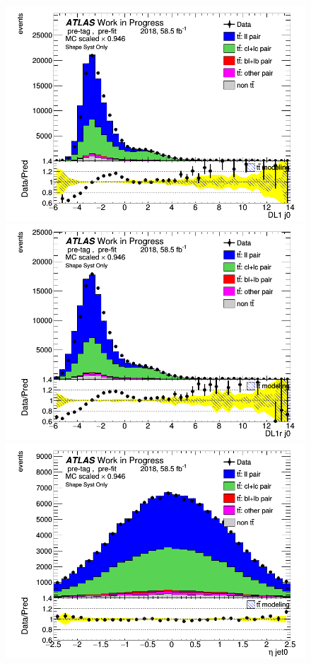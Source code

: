 \documentclass[letterpaper,12pt]{article}
\begin{document}
\begin{figure}[h]
\begin{minipage}[b]{.45\textwidth}
\centering
\includegraphics[width=1\textwidth]{Distribution_March/DataMC_J0_DL1.png}
\end{minipage}\hfill
\begin{minipage}[b]{.45\textwidth}
\centering
\includegraphics[width=1\textwidth]{Distribution_March/DataMC_J0_DL1r.png}
\end{minipage}\hfill
\begin{minipage}[b]{.45\textwidth}
\centering
\includegraphics[width=1\textwidth]{Distribution_March/DataMC_J0_eta.png}

\end{minipage}
\end{figure}
\end{document}
